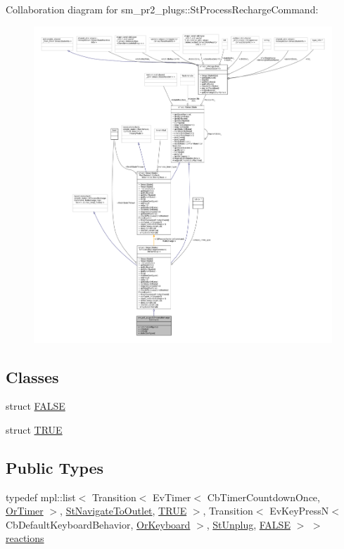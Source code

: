 Collaboration diagram for sm\+\_\+pr2\+\_\+plugs\+:\+:St\+Process\+Recharge\+Command\+:
\nopagebreak
\begin{figure}[H]
\begin{center}
\leavevmode
\includegraphics[width=350pt]{structsm__pr2__plugs_1_1StProcessRechargeCommand__coll__graph}
\end{center}
\end{figure}
\subsection*{Classes}
\begin{DoxyCompactItemize}
\item 
struct \hyperlink{structsm__pr2__plugs_1_1StProcessRechargeCommand_1_1FALSE}{F\+A\+L\+SE}
\item 
struct \hyperlink{structsm__pr2__plugs_1_1StProcessRechargeCommand_1_1TRUE}{T\+R\+UE}
\end{DoxyCompactItemize}
\subsection*{Public Types}
\begin{DoxyCompactItemize}
\item 
typedef mpl\+::list$<$ Transition$<$ Ev\+Timer$<$ Cb\+Timer\+Countdown\+Once, \hyperlink{classsm__pr2__plugs_1_1OrTimer}{Or\+Timer} $>$, \hyperlink{structsm__pr2__plugs_1_1StNavigateToOutlet}{St\+Navigate\+To\+Outlet}, \hyperlink{structsm__pr2__plugs_1_1StProcessRechargeCommand_1_1TRUE}{T\+R\+UE} $>$, Transition$<$ Ev\+Key\+PressN$<$ Cb\+Default\+Keyboard\+Behavior, \hyperlink{classsm__pr2__plugs_1_1OrKeyboard}{Or\+Keyboard} $>$, \hyperlink{structsm__pr2__plugs_1_1StUnplug}{St\+Unplug}, \hyperlink{structsm__pr2__plugs_1_1StProcessRechargeCommand_1_1FALSE}{F\+A\+L\+SE} $>$ $>$ \hyperlink{structsm__pr2__plugs_1_1StProcessRechargeCommand_a97c8363f0989dc9dabc36a20445ba569}{reactions}
\end{DoxyCompactItemize}
